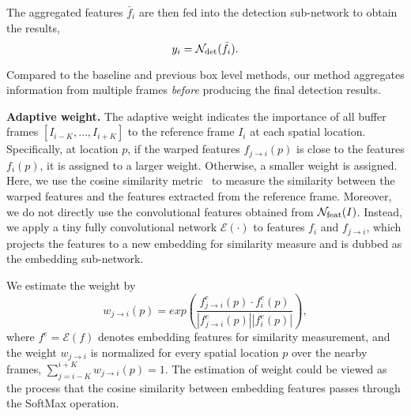 \documentclass[10pt,twocolumn,letterpaper]{article}
\begin{document}
The aggregated features $\bar f_i$ are then fed into the detection sub-network to obtain the results,
\begin{equation}
y_i = \mathcal{N}_{\rm det}(\bar f_i).
\end{equation}

Compared to the baseline and previous box level methods, our method aggregates information from multiple frames \emph{before} producing the final detection results.

\textbf{Adaptive weight.} The adaptive weight indicates the importance of all buffer frames $[I_{i-K},\dots, I_{i+K}]$ to the reference frame $I_i$ at each spatial location. Specifically, at location $p$, if the warped features $f_{j \rightarrow i}(p)$ is close to the features $f_i(p)$, it is assigned to a larger weight. Otherwise, a smaller weight is assigned. Here, we use the cosine similarity metric~\cite{luo2017cosine} to measure the similarity between the warped features and the features extracted from the reference frame. Moreover, we do not directly use the convolutional features obtained from $\mathcal{N}_{\rm feat}(I)$. Instead, we apply a tiny fully convolutional network $\mathcal{E}(\cdot)$ to features $f_i$ and $f_{j \rightarrow i}$, which projects the features to a new embedding for similarity measure and is dubbed as the embedding sub-network.

We estimate the weight by
\begin{equation}
w_{j \rightarrow i}(p)= exp(\frac{f^e_{j \rightarrow i}(p)\cdot f^e_i(p)}{|f^e_{j \rightarrow i}(p)| |f^e_i(p)|}),
\end{equation}
where $f^e = \mathcal{E}(f)$ denotes embedding features for similarity measurement, and the weight $w_{j \rightarrow i}$ is normalized for every spatial location $p$ over the nearby frames, $\sum_{j = i - K}^{i + K} w_{j \rightarrow i}(p) = 1$. The estimation of weight could be viewed as the process that the cosine similarity between embedding features passes through the SoftMax operation.
\end{document}
